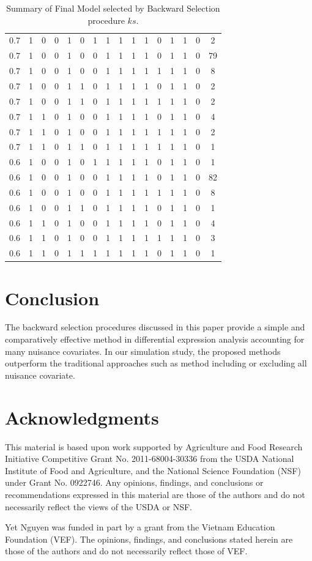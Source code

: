 \documentclass[12pt, letter]{article}\usepackage[]{graphicx}\usepackage[]{color}
\begin{document}
\begin{table}
{\begin{tabular}{|c|c|c|c|c|c|c|c|c|c|c|c|c|c|c|c|}
   \hline
0.7 & 1 & 0 & 0 & 1 & 0 & 1 & 1 & 1 & 1 & 1 & 0 & 1 & 1 & 0 & 2 \\ 
  0.7 & 1 & 0 & 0 & 1 & 0 & 0 & 1 & 1 & 1 & 1 & 0 & 1 & 1 & 0 & 79 \\ 
  0.7 & 1 & 0 & 0 & 1 & 0 & 0 & 1 & 1 & 1 & 1 & 1 & 1 & 1 & 0 & 8 \\ 
  0.7 & 1 & 0 & 0 & 1 & 1 & 0 & 1 & 1 & 1 & 1 & 0 & 1 & 1 & 0 & 2 \\ 
  0.7 & 1 & 0 & 0 & 1 & 1 & 0 & 1 & 1 & 1 & 1 & 1 & 1 & 1 & 0 & 2 \\ 
  0.7 & 1 & 1 & 0 & 1 & 0 & 0 & 1 & 1 & 1 & 1 & 0 & 1 & 1 & 0 & 4 \\ 
  0.7 & 1 & 1 & 0 & 1 & 0 & 0 & 1 & 1 & 1 & 1 & 1 & 1 & 1 & 0 & 2 \\ 
  0.7 & 1 & 1 & 0 & 1 & 1 & 0 & 1 & 1 & 1 & 1 & 1 & 1 & 1 & 0 & 1 \\ 
   \hline
0.6 & 1 & 0 & 0 & 1 & 0 & 1 & 1 & 1 & 1 & 1 & 0 & 1 & 1 & 0 & 1 \\ 
  0.6 & 1 & 0 & 0 & 1 & 0 & 0 & 1 & 1 & 1 & 1 & 0 & 1 & 1 & 0 & 82 \\ 
  0.6 & 1 & 0 & 0 & 1 & 0 & 0 & 1 & 1 & 1 & 1 & 1 & 1 & 1 & 0 & 8 \\ 
  0.6 & 1 & 0 & 0 & 1 & 1 & 0 & 1 & 1 & 1 & 1 & 0 & 1 & 1 & 0 & 1 \\ 
  0.6 & 1 & 1 & 0 & 1 & 0 & 0 & 1 & 1 & 1 & 1 & 0 & 1 & 1 & 0 & 4 \\ 
  0.6 & 1 & 1 & 0 & 1 & 0 & 0 & 1 & 1 & 1 & 1 & 1 & 1 & 1 & 0 & 3 \\ 
  0.6 & 1 & 1 & 0 & 1 & 1 & 1 & 1 & 1 & 1 & 1 & 0 & 1 & 1 & 0 & 1 \\ 
   \hline
\end{tabular}
}
\caption{Summary of Final Model selected by Backward Selection procedure $ks$.} 
\label{simks}
\end{table}
\newpage
\section{ Conclusion}
The backward selection procedures discussed in this paper provide a simple and comparatively effective method in differential expression analysis accounting for many nuisance covariates. In our simulation study, the proposed methods outperform the traditional approaches such as method including or excluding all nuisance covariate. 


\section*{ Acknowledgments}
This material is based upon work supported by Agriculture and Food
Research Initiative Competitive Grant No. 2011-68004-30336 from
the USDA National Institute of Food and Agriculture, and the
National Science Foundation (NSF) under Grant No. 0922746.
Any opinions, findings, and conclusions or recommendations expressed in this material are those of the authors and do not necessarily reflect the views of the USDA or NSF.

Yet Nguyen was funded in part by a grant from the Vietnam Education Foundation (VEF). The opinions, findings, and conclusions stated herein are those of the authors and do not necessarily reflect those of VEF.




\end{document}
